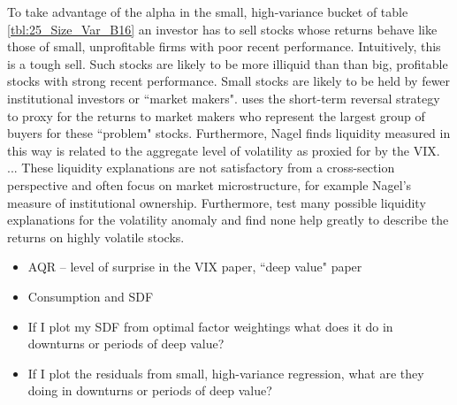 To take advantage of the alpha in the small, high-variance bucket of table
\ref{tbl:25_Size_Var_B16} an investor has to sell stocks whose returns behave
like those of small, unprofitable firms with poor recent performance.
Intuitively, this is a tough sell.
Such stocks are likely to be more illiquid than than big, profitable stocks
with strong recent performance.
Small stocks are likely to be held by fewer institutional investors or
``market makers".
\textcite{nagel2012evaporating} uses the short-term reversal strategy to proxy
for the returns to market makers who represent the largest group of buyers for
these ``problem" stocks.
Furthermore, Nagel finds liquidity measured in this way is related to the
aggregate level of volatility as proxied for by the VIX.
\textcite{nagel2005short} ...
These liquidity explanations are not satisfactory from a cross-section
perspective and often focus on market microstructure, for example Nagel's
measure of institutional ownership.
Furthermore, \textcite{ang2006cross} test many possible liquidity
explanations
for the volatility anomaly and find none help greatly to describe the returns
on highly volatile stocks.

\begin{itemize}
  \item AQR -- level of surprise in the VIX paper, ``deep value" paper
  \item Consumption and SDF
  \item If I plot my SDF from optimal factor weightings what does it do in
  downturns or periods of deep value?
  \item If I plot the residuals from small, high-variance regression, what are
  they doing in downturns or periods of deep value?
\end{itemize}
